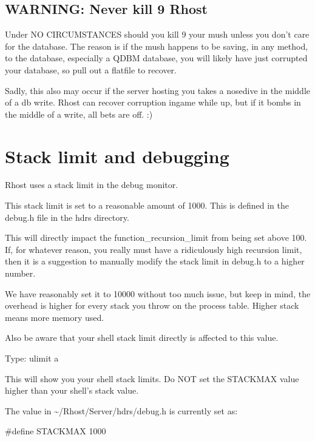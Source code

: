 \documentclass[letterpaper,10pt,english]{sphinxmanual}
\begin{document}
\section{WARNING: Never kill \sphinxhyphen{}9 Rhost}
\label{\detokenize{17-shutdown:warning-never-kill-9-rhost}}
\sphinxAtStartPar
Under NO CIRCUMSTANCES should you kill \sphinxhyphen{}9 your mush unless you don’t care for the
database.  The reason is if the mush happens to be saving, in any method, to the
database, especially a QDBM database, you will likely have just corrupted your
database, so pull out a flatfile to recover.

\sphinxAtStartPar
Sadly, this also may occur if the server hosting you takes a nose\sphinxhyphen{}dive in the middle
of a db write.  Rhost can recover corruption in\sphinxhyphen{}game while up, but if it bombs
in the middle of a write, all bets are off. :)


\chapter{Stack limit and debugging}
\label{\detokenize{18-debug:stack-limit-and-debugging}}\label{\detokenize{18-debug::doc}}
\sphinxAtStartPar
Rhost uses a stack limit in the debug monitor.

\sphinxAtStartPar
This stack limit is set to a reasonable amount of 1000.
This is defined in the debug.h file in the hdrs directory.

\sphinxAtStartPar
This will directly impact the function\_recursion\_limit from being
set above 100.  If, for whatever reason, you really must have
a ridiculously high recursion limit, then it is a suggestion to
manually modify the stack limit in debug.h to a higher number.

\sphinxAtStartPar
We have reasonably set it to 10000 without too much issue, but keep
in mind, the overhead is higher for every stack you throw on the
process table.  Higher stack means more memory used.

\sphinxAtStartPar
Also be aware that your shell stack limit directly is affected
to this value.

\sphinxAtStartPar
Type: ulimit \sphinxhyphen{}a

\sphinxAtStartPar
This will show you your shell stack limits.  Do NOT set the
STACKMAX value higher than your shell’s stack value.

\sphinxAtStartPar
The value in \textasciitilde{}/Rhost/Server/hdrs/debug.h is currently set as:

\sphinxAtStartPar
\#define STACKMAX 1000
\end{document}
